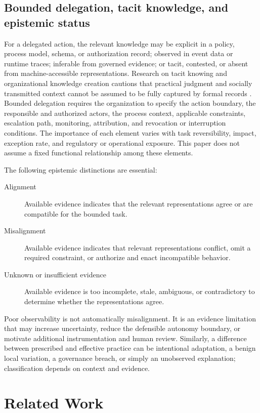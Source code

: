 \documentclass[11pt,letterpaper]{article}
\newcommand{\parencite}[1]{\citep{#1}}
\begin{document}
\subsection{Bounded delegation, tacit knowledge, and epistemic status}
For a delegated action, the relevant knowledge may be explicit in a policy, process model, schema, or authorization record; observed in event data or runtime traces; inferable from governed evidence; or tacit, contested, or absent from machine-accessible representations. Research on tacit knowing and organizational knowledge creation cautions that practical judgment and socially transmitted context cannot be assumed to be fully captured by formal records \parencite{polanyi1966tacit,nonaka1995knowledge}. Bounded delegation requires the organization to specify the action boundary, the responsible and authorized actors, the process context, applicable constraints, escalation path, monitoring, attribution, and revocation or interruption conditions. The importance of each element varies with task reversibility, impact, exception rate, and regulatory or operational exposure. This paper does not assume a fixed functional relationship among these elements.

The following epistemic distinctions are essential:

\begin{description}
\item[Alignment] Available evidence indicates that the relevant representations agree or are compatible for the bounded task.
\item[Misalignment] Available evidence indicates that relevant representations conflict, omit a required constraint, or authorize and enact incompatible behavior.
\item[Unknown or insufficient evidence] Available evidence is too incomplete, stale, ambiguous, or contradictory to determine whether the representations agree.
\end{description}

Poor observability is not automatically misalignment. It is an evidence limitation that may increase uncertainty, reduce the defensible autonomy boundary, or motivate additional instrumentation and human review. Similarly, a difference between prescribed and effective practice can be intentional adaptation, a benign local variation, a governance breach, or simply an unobserved explanation; classification depends on context and evidence.

\section{Related Work}
\end{document}
